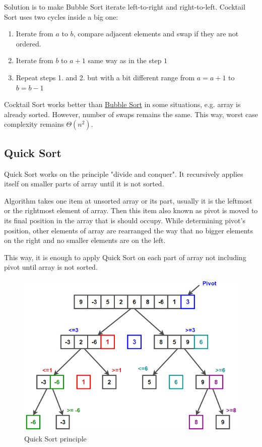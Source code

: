 \documentclass[
  field=inf,
  biblatex,
  language=english,
  glossaries,
  index
]{kidiplom}
\begin{document}
Solution is to make Bubble Sort iterate left-to-right and right-to-left. Cocktail Sort uses two cycles inside a big one:

\begin{enumerate}
 \item Iterate from $a$ to $b$, compare adjacent elements and swap if they are not ordered.
 \item Iterate from $b$ to $a + 1$ same way as in the step $1$
 \item Repeat steps 1. and 2. but with a bit different range from $a = a + 1$ to $b = b - 1$
\end{enumerate}

Cocktail Sort works better than \hyperref[sec:bubble]{Bubble Sort} in some situations, e.g. array is already sorted. However, number of swaps remains the same. This way, worst case complexity remains $\Theta(n^2)$.

\subsection{Quick Sort}

Quick Sort works on the principle "divide and conquer". It recursively applies itself on smaller parts of array until it is not sorted.

Algorithm takes one item at unsorted array or its part, usually it is the leftmost or the rightmost element of array. Then this item also known as pivot is moved to its final position in the array that is should occupy. While determining pivot's position, other elements of array are rearranged the way that no bigger elements on the right and no smaller elements are on the left.

This way, it is enough to apply Quick Sort on each part of array not including pivot until array is not sorted.

\begin{figure}[H]
\begin{center}
	
	\includegraphics[scale=0.7]{img/Quicksort.png}
	\caption{Quick Sort principle}\label{fig:insert}
\end{center}
\end{figure}
\end{document}
